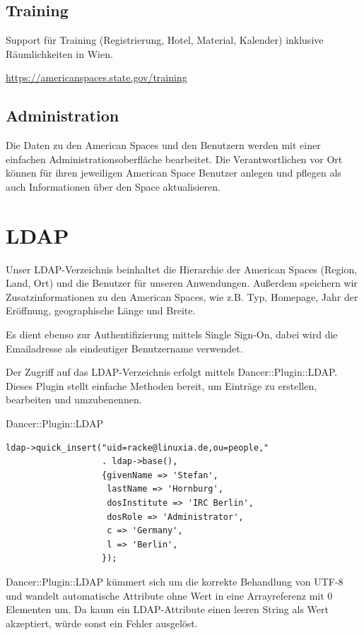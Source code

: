 \subsection{Training}

Support für Training (Registrierung, Hotel, Material, Kalender)
inklusive Räumlichkeiten in Wien.

\url{https://americanspaces.state.gov/training}
    
\subsection{Administration}

Die Daten zu den American Spaces und den Benutzern werden
mit einer einfachen Administrationsoberfläche bearbeitet.
Die Verantwortlichen vor Ort können für ihren
jeweiligen American Space Benutzer anlegen und pflegen
als auch Informationen über den Space aktualisieren.

\section{LDAP}

Unser LDAP-Verzeichnis beinhaltet die Hierarchie der American Spaces
(Region, Land, Ort) und die Benutzer für unseren Anwendungen.
Außerdem speichern wir Zusatzinformationen zu den American Spaces,
wie z.B. Typ, Homepage, Jahr der Eröffnung, geographische Länge und Breite.
    
Es dient ebenso zur Authentifizierung mittels Single Sign-On, dabei
wird die Emailadresse als eindeutiger Benutzername verwendet.
    
Der Zugriff auf das LDAP-Verzeichnis erfolgt mittels
Dancer::Plugin::LDAP. Dieses Plugin stellt einfache
Methoden bereit, um Einträge zu erstellen, bearbeiten
und umzubenennen.

\begin{frame}[fragile]{Dancer::Plugin::LDAP}
\begin{lstlisting}
ldap->quick_insert("uid=racke@linuxia.de,ou=people," 
                   . ldap->base(),
                   {givenName => 'Stefan',
                    lastName => 'Hornburg',
                    dosInstitute => 'IRC Berlin',
                    dosRole => 'Administrator',
                    c => 'Germany',
                    l => 'Berlin',
                   });
\end{lstlisting}
\end{frame}

Dancer::Plugin::LDAP kümmert sich um die korrekte Behandlung
von UTF-8 und wandelt automatische Attribute ohne Wert in eine
Arrayreferenz mit 0 Elementen um. Da kaum ein LDAP-Attribute einen
leeren String als Wert akzeptiert, würde sonst ein Fehler
ausgelöst.

